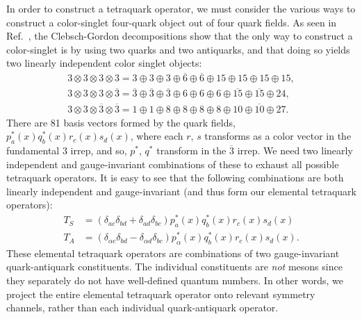 In order to construct a tetraquark operator, we must consider the various ways to construct a color-singlet four-quark object out of four quark fields. As seen in Ref.~\cite{pittir33243}, the Clebsch-Gordon decompositions show that the only way to construct a color-singlet is by using two quarks and two antiquarks, and that doing so yields two linearly independent color singlet objects:
\begin{equation}
\begin{array}{l}
    {3 \otimes 3 \otimes 3 \otimes 3=3\oplus3\oplus3\oplus\overline{6}\oplus\overline{6}\oplus15\oplus15\oplus15\oplus15},\\
    {3 \otimes 3 \otimes 3 \otimes \overline{3}=\overline{3}\oplus\overline{3}\oplus\overline{3}\oplus6\oplus6\oplus6\oplus\overline{15}\oplus\overline{15}\oplus24},\\
    {3 \otimes 3 \otimes \overline{3} \otimes \overline{3}=1\oplus1\oplus8\oplus8\oplus8\oplus8\oplus10\oplus\overline{10}\oplus27}.
\end{array}
\end{equation}
There are 81 basis vectors formed by the quark fields, $p_{a}^{*}(x) q_{b}^{*}(x) r_{c}(x) s_{d}(x)$, where each $r$, $s$ transforms as a color vector in the fundamental $3$ irrep, and so, $p^{*}$, $q^{*}$ transform in the $\overline 3$ irrep. We need two linearly independent and gauge-invariant combinations of these to exhaust all possible tetraquark operators. It is easy to see that the following combinations are both linearly independent and gauge-invariant (and thus form our elemental tetraquark operators):
\begin{equation}\label{eq:tsta}
\begin{aligned} T_{S} &=\left(\delta_{a c} \delta_{b d}+\delta_{a d} \delta_{b c}\right) p_{a}^{*}(x) q_{b}^{*}(x) r_{c}(x) s_{d}(x) \\ T_{A} &=\left(\delta_{\alpha c} \delta_{b d}-\delta_{\alpha d} \delta_{b c}\right) p_{\alpha}^{*}(x) q_{b}^{*}(x) r_{c}(x) s_{d}(x).\end{aligned}
\end{equation}
These elemental tetraquark operators are combinations of two gauge-invariant quark-antiquark constituents. The individual constituents are \textit{not} mesons since they separately do not have well-defined quantum numbers. In other words, we project the entire elemental tetraquark operator onto relevant symmetry channels, rather than each individual quark-antiquark operator.

